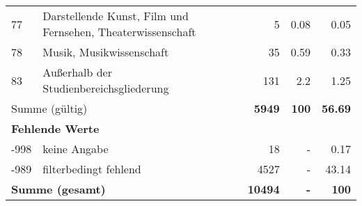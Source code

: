 \begin{longtable}{lXrrr}
        77 & \multicolumn{1}{X}{Darstellende Kunst, Film und Fernsehen, Theaterwissenschaft} & %
          \num{5} &
          \num[round-mode=places,round-precision=2]{0.08} &
          \num[round-mode=places,round-precision=2]{0.05} \\

        78 & \multicolumn{1}{X}{Musik, Musikwissenschaft} & %
          \num{35} &
          \num[round-mode=places,round-precision=2]{0.59} &
          \num[round-mode=places,round-precision=2]{0.33} \\

        83 & \multicolumn{1}{X}{Außerhalb der Studienbereichsgliederung} & %
          \num{131} &
          \num[round-mode=places,round-precision=2]{2.2} &
          \num[round-mode=places,round-precision=2]{1.25} \\

     \midrule
     \multicolumn{2}{l}{Summe (gültig)} &
       \textbf{\num{5949}} &
     \textbf{\num{100}} &
       \textbf{\num[round-mode=places,round-precision=2]{56.69}} \\
     \multicolumn{5}{l}{\textbf{Fehlende Werte}}\\
       -998 &
       keine Angabe &
         \num{18} &
        - &
         \num[round-mode=places,round-precision=2]{0.17} \\
       -989 &
       filterbedingt fehlend &
         \num{4527} &
        - &
         \num[round-mode=places,round-precision=2]{43.14} \\
     \midrule
     \multicolumn{2}{l}{\textbf{Summe (gesamt)}} &
          \textbf{\num{10494}} &
        \textbf{-} &
        \textbf{\num{100}} \\
     \bottomrule
     \end{longtable}
     
